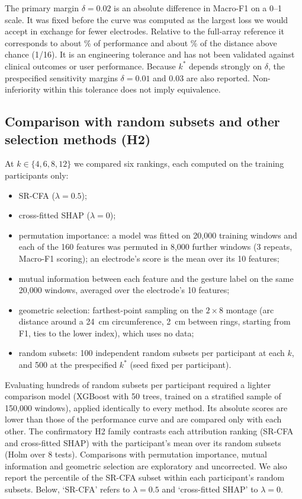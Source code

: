 The primary margin $\delta = 0.02$ is an absolute difference in Macro-F1 on a 0--1 scale. It was fixed before the curve was computed as the largest loss we would accept in exchange for fewer electrodes. Relative to the full-array reference it corresponds to about \MarginPctOfRef\% of performance and about \MarginPctAboveChance\% of the distance above chance (1/16). It is an engineering tolerance and has not been validated against clinical outcomes or user performance. Because $k^*$ depends strongly on $\delta$, the prespecified sensitivity margins $\delta = 0.01$ and $0.03$ are also reported. Non-inferiority within this tolerance does not imply equivalence.

\subsection{Comparison with random subsets and other selection methods (H2)}
At $k \in \{4, 6, 8, 12\}$ we compared six rankings, each computed on the training participants only:
\begin{itemize}
\item SR-CFA ($\lambda = 0.5$);
\item cross-fitted SHAP ($\lambda = 0$);
\item permutation importance: a model was fitted on 20,000 training windows and each of the 160 features was permuted in 8,000 further windows (3 repeats, Macro-F1 scoring); an electrode's score is the mean over its 10 features;
\item mutual information between each feature and the gesture label on the same 20,000 windows, averaged over the electrode's 10 features;
\item geometric selection: farthest-point sampling on the $2 \times 8$ montage (arc distance around a 24~cm circumference, 2~cm between rings, starting from F1, ties to the lower index), which uses no data;
\item random subsets: 100 independent random subsets per participant at each $k$, and 500 at the prespecified $k^*$ (seed fixed per participant).
\end{itemize}
Evaluating hundreds of random subsets per participant required a lighter comparison model (XGBoost with 50 trees, trained on a stratified sample of 150,000 windows), applied identically to every method. Its absolute scores are lower than those of the performance curve and are compared only with each other. The confirmatory H2 family contrasts each attribution ranking (SR-CFA and cross-fitted SHAP) with the participant's mean over its random subsets (Holm over 8 tests). Comparisons with permutation importance, mutual information and geometric selection are exploratory and uncorrected. We also report the percentile of the SR-CFA subset within each participant's random subsets. Below, `SR-CFA' refers to $\lambda = 0.5$ and `cross-fitted SHAP' to $\lambda = 0$.

